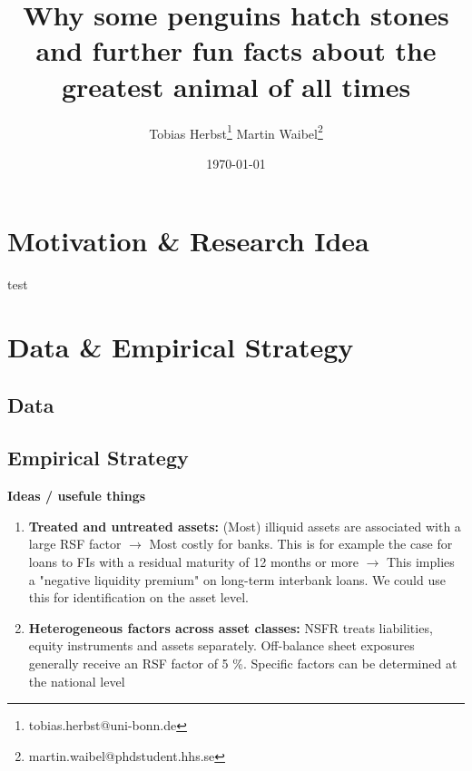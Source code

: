 \documentclass[a4paper,12pt]{article}
\title{Why some penguins hatch stones and further fun facts about the greatest animal of all times}
\author{Tobias Herbst\thanks{tobias.herbst@uni-bonn.de} \hspace{1cm}  Martin Waibel\thanks{martin.waibel@phdstudent.hhs.se} }
\date{\today}
\begin{document}
\maketitle

\begin{abstract}
\lipsum[1-1]




\end{abstract}

\clearpage
\section{Motivation \& Research Idea}
\label{motivation}

test

\section{Data \& Empirical Strategy}
\label{data_strategy}

\subsection{Data}
\label{data}



\subsection{Empirical Strategy}
\label{emp_strategy}

\textbf{Ideas / usefule things}
\begin{enumerate}
	\item \textbf{Treated and untreated assets:} (Most) illiquid assets are associated with a large RSF factor $\rightarrow$ Most costly for banks. This is for example the case for loans to FIs with a residual maturity of 12 months or more $\rightarrow$ This implies a "negative liquidity premium" on long-term interbank loans. We could use this for identification on the asset level.

	\item \textbf{Heterogeneous factors across asset classes:} NSFR treats liabilities, equity instruments and assets separately. Off-balance sheet exposures generally receive an RSF factor of 5 \%. Specific factors can be determined at the national level 

\end{enumerate}
\end{document}
